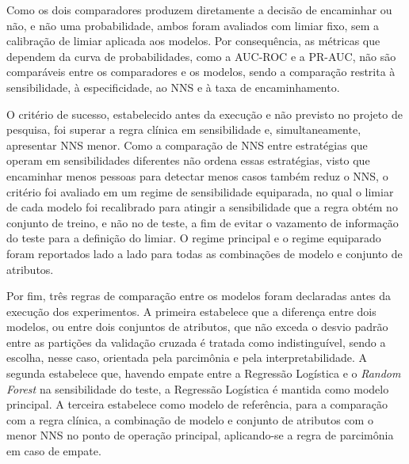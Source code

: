 Como os dois comparadores produzem diretamente a decisão de encaminhar ou não, e não uma probabilidade, ambos foram avaliados com limiar fixo, sem a calibração de limiar aplicada aos modelos. Por consequência, as métricas que dependem da curva de probabilidades, como a AUC-ROC e a PR-AUC, não são comparáveis entre os comparadores e os modelos, sendo a comparação restrita à sensibilidade, à especificidade, ao NNS e à taxa de encaminhamento.

O critério de sucesso, estabelecido antes da execução e não previsto no projeto de pesquisa, foi superar a regra clínica em sensibilidade e, simultaneamente, apresentar NNS menor. Como a comparação de NNS entre estratégias que operam em sensibilidades diferentes não ordena essas estratégias, visto que encaminhar menos pessoas para detectar menos casos também reduz o NNS, o critério foi avaliado em um regime de sensibilidade equiparada, no qual o limiar de cada modelo foi recalibrado para atingir a sensibilidade que a regra obtém no conjunto de treino, e não no de teste, a fim de evitar o vazamento de informação do teste para a definição do limiar. O regime principal e o regime equiparado foram reportados lado a lado para todas as combinações de modelo e conjunto de atributos.

Por fim, três regras de comparação entre os modelos foram declaradas antes da execução dos experimentos. A primeira estabelece que a diferença entre dois modelos, ou entre dois conjuntos de atributos, que não exceda o desvio padrão entre as partições da validação cruzada é tratada como indistinguível, sendo a escolha, nesse caso, orientada pela parcimônia e pela interpretabilidade. A segunda estabelece que, havendo empate entre a Regressão Logística e o \textit{Random Forest} na sensibilidade do teste, a Regressão Logística é mantida como modelo principal. A terceira estabelece como modelo de referência, para a comparação com a regra clínica, a combinação de modelo e conjunto de atributos com o menor NNS no ponto de operação principal, aplicando-se a regra de parcimônia em caso de empate.

